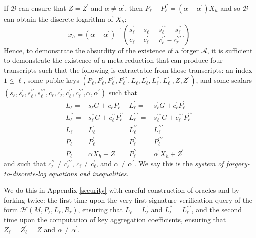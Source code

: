 \documentclass{iacrtrans}
\theoremstyle{definition}
\numberwithin{theorem}{subsection}
\numberwithin{lemma}{theorem}
\newcommand{\adversary}{\mathcal{A}}
\begin{document}
If $\mathcal{B}$ can ensure that $Z = Z^\prime$ and $\alpha \neq \alpha^\prime$, then $P_\ell - P_\ell^{\prime \prime} = (\alpha - \alpha^\prime)X_h$ and so $\mathcal{B}$ can obtain the discrete logarithm of $X_h$: \[x_h = (\alpha - \alpha^\prime)^{-1}\left(\frac{s_\ell^\prime - s_\ell}{c_\ell - c_\ell^\prime} - \frac{s_\ell^{\prime \prime \prime} - s_\ell^{\prime \prime}}{c_\ell^{\prime \prime} - c_\ell^{\prime \prime \prime}}.\right)\] Hence, to demonstrate the absurdity of the existence of a forger $\adversary$, it is sufficient to demonstrate the existence of a meta-reduction that can produce four transcripts such that the following is extractable from those transcripts: an index $1 \leq \ell$, some public keys $(P_\ell, P_\ell^\prime, P_\ell^{\prime \prime}, P_\ell^{\prime \prime \prime}, L_\ell, L_\ell^\prime, L_\ell^{\prime \prime}, L_\ell^{\prime \prime \prime}, Z, Z^\prime)$, and some scalars $(s_\ell, s_\ell^\prime, s_\ell^{\prime \prime}, s_\ell^{\prime \prime \prime}, c_\ell, c_\ell^\prime, c_\ell^{\prime \prime}, c_\ell^{\prime \prime \prime}, \alpha, \alpha^\prime)$ such that
\begin{align*}
L_\ell = & s_\ell G + c_\ell P_\ell & 
L_{\ell}^\prime =& s_\ell^\prime G + c_\ell^\prime P_\ell^\prime\\
L_\ell^{\prime \prime} =& s_\ell^{\prime \prime} G + c_\ell^{\prime \prime} P_\ell^{\prime \prime} & 
L_{\ell}^{\prime \prime \prime} =& s_\ell^{\prime\prime \prime} G + c_\ell^{\prime \prime \prime} P_\ell^{\prime \prime\prime}\\
L_\ell =& L_\ell^{\prime} & 
L_\ell^{\prime \prime} =& L_\ell^{\prime \prime \prime}\\
P_\ell =& P_\ell^{\prime} & 
P_\ell^{\prime \prime} =& P_\ell^{\prime \prime \prime}\\
P_\ell =& \alpha X_h + Z & 
P_\ell^{\prime \prime} =&  \alpha^\prime X_h + Z^\prime
\end{align*} and such that $c_\ell^{\prime \prime} \neq c_\ell^{\prime \prime \prime}$, $c_\ell \neq c_\ell^\prime$, and $\alpha \neq \alpha^\prime$. We say this is the \textit{system of forgery-to-discrete-log equations and inequalities}.

We do this in Appendix \ref{security} with careful construction of oracles and by forking twice: the first time upon the very first signature verification query of the form $\mathcal{H}(M,P_\ell,L_\ell,R_\ell)$, ensuring that $L_\ell = L_\ell^\prime$ and $L_\ell^{\prime \prime} = L_\ell^{\prime \prime \prime}$, and the second time upon the computation of key aggregation coefficients, ensuring that $Z_\ell = Z_\ell^\prime = Z$ and $\alpha \neq \alpha^\prime$.
\end{document}
